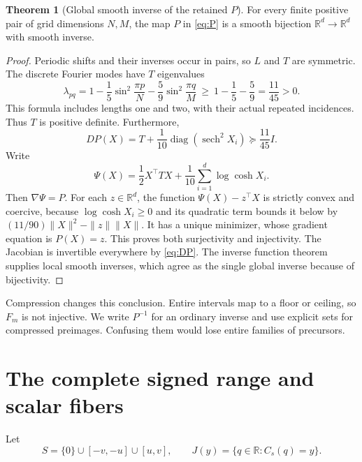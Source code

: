 \documentclass[11pt,a4paper]{article}
\theoremstyle{definition}
\newtheorem{theorem}{Theorem}[section]
\theoremstyle{remark}\newtheorem{remark}[theorem]{Remark}
\newcommand{\R}{\mathbb R}
\numberwithin{equation}{section}
\begin{document}
\begin{theorem}[Global smooth inverse of the retained $P$]\label{thm:inverse}
For every finite positive pair of grid dimensions $N,M$, the map $P$ in
\eqref{eq:P} is a smooth bijection $\R^d\to\R^d$ with smooth inverse.
\end{theorem}
\begin{proof}
Periodic shifts and their inverses occur in pairs, so $L$ and $T$ are symmetric.
The discrete Fourier modes have $T$ eigenvalues
\begin{equation}\label{eq:eigen}
 \lambda_{pq}=1-\frac15\sin^2\!\frac{\pi p}{N}
                 -\frac59\sin^2\!\frac{\pi q}{M}
 \ \geq\ 1-\frac15-\frac59=\frac{11}{45}>0.
\end{equation}
This formula includes lengths one and two, with their actual repeated incidences.
Thus $T$ is positive definite. Furthermore,
\begin{equation}\label{eq:DP}
 DP(X)=T+\frac1{10}\operatorname{diag}(\operatorname{sech}^2 X_i)
 \succeq\frac{11}{45}I.
\end{equation}
Write
\begin{equation}\label{eq:potential}
 \Psi(X)=\frac12 X^{\top}TX+\frac1{10}\sum_{i=1}^d\log\cosh X_i .
\end{equation}
Then $\nabla\Psi=P$. For each $z\in\R^d$, the function
$\Psi(X)-z^{\top}X$ is strictly convex and coercive, because
$\log\cosh X_i\geq0$ and its quadratic term bounds it below by
$(11/90)\|X\|^2-\|z\|\|X\|$. It has a unique minimizer, whose gradient equation
is $P(X)=z$. This proves both surjectivity and injectivity.
The Jacobian is invertible everywhere by \eqref{eq:DP}. The inverse function
theorem supplies local smooth inverses, which agree as the single global inverse
because of bijectivity.
\end{proof}

Compression changes this conclusion. Entire intervals map to a floor or ceiling,
so $F_m$ is not injective. We write $P^{-1}$ for an ordinary inverse and use
explicit sets for compressed preimages. Confusing them would lose entire families
of precursors.

\section{The complete signed range and scalar fibers}\label{sec:range}
Let
\begin{equation}\label{eq:S}
 S=\{0\}\cup[-v,-u]\cup[u,v],\qquad J(y)=\{q\in\R:C_s(q)=y\}.
\end{equation}
\end{document}
